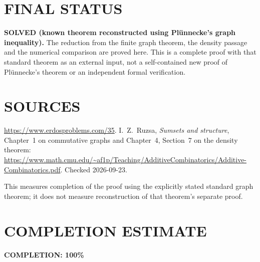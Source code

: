 \section{FINAL STATUS}
\textbf{SOLVED (known theorem reconstructed using Pl\"unnecke's graph inequality).}
The reduction from the finite graph theorem, the density passage and
the numerical comparison are proved here. This is a complete proof
with that standard theorem as an external input, not a self-contained
new proof of Pl\"unnecke's theorem or an independent formal verification.

\section{SOURCES}
\url{https://www.erdosproblems.com/35}.
I.~Z.~Ruzsa, \emph{Sumsets and structure}, Chapter~1 on commutative
graphs and Chapter~4, Section~7 on the density theorem:
\url{https://www.math.cmu.edu/~af1p/Teaching/AdditiveCombinatorics/Additive-Combinatorics.pdf}.
Checked 2026-09-23.

This measures completion of the proof using the explicitly stated
standard graph theorem; it does not measure reconstruction of that
theorem's separate proof.

\section{COMPLETION ESTIMATE}
\textbf{COMPLETION: 100\%}
